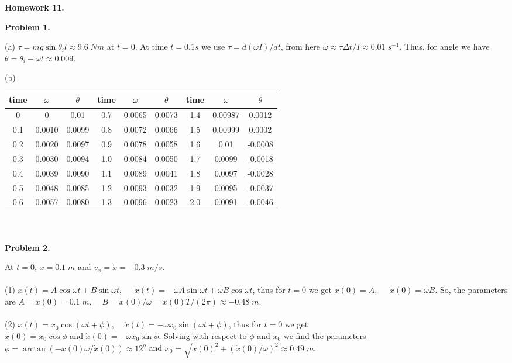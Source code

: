 \documentclass[12pt]{article}
\begin{document}
\begin{center}
{\bf\large Homework 11.}
\end{center}

{\bf Problem 1.}

(a) $\tau=mg\sin\theta_i l\approx 9.6\;Nm$ at $t=0$.
At time $t=0.1s$ we use $\tau=d(\omega I)/dt$, from here $\omega\approx \tau\Delta t /I\approx
0.01\;s^{-1}$. Thus, for angle we have $\theta=\theta_i-\omega t\approx 0.009$.

(b)

\begin{tabular}{|c|c|c||c|c|c||c|c|c|}
\hline
time & $\omega$ &$\theta$& time& $\omega$ & $\theta$&time&$\omega$&$\theta$\\
\hline
0&0&0.01&0.7&0.0065&0.0073&1.4&0.00987&0.0012\\
0.1& 0.0010&0.0099&0.8& 0.0072&0.0066&1.5&0.00999&0.0002\\
0.2& 0.0020&0.0097&0.9& 0.0078&0.0058&1.6&0.01&-0.0008\\
0.3& 0.0030&0.0094&1.0& 0.0084&0.0050&1.7&0.0099&-0.0018\\
0.4& 0.0039&0.0090&1.1& 0.0089&0.0041&1.8&0.0097&-0.0028\\
0.5& 0.0048&0.0085&1.2& 0.0093&0.0032&1.9&0.0095&-0.0037\\
0.6& 0.0057&0.0080&1.3& 0.0096&0.0023&2.0&0.0091&-0.0046\\
\hline
\end{tabular}\\
\\

{\bf Problem 2.}

At $t=0$, $x=0.1\;m$ and $v_x=\dot{x}=-0.3\;m/s$.\\
\\
(1) $x(t)=A\cos\omega t + B\sin\omega t,\;\;\;\;\;\dot{x}(t)=-\omega A\sin\omega t + \omega B\cos\omega t$, thus for $t=0$ we get $x(0)=A,\;\;\;\;\;\dot{x}(0)= \omega B$. So, the parameters are
$A=x(0)=0.1\;m,\;\;\;\;B=\dot{x}(0)/\omega=\dot{x}(0) T/(2\pi)\approx -0.48\;m$.\\
\\
(2) $x(t)=x_0 \cos(\omega t +\phi),\;\;\;\;\dot{x}(t)=-\omega x_0 \sin(\omega t +\phi)$, thus for $t=0$
we get\\  $x(0)=x_0\cos\phi$ and $\dot{x}(0)=-\omega x_0 \sin\phi$. Solving with respect to $\phi$ and $x_0$ we find the parameters $\phi=\arctan\left(-x(0)\omega/\dot{x}(0)\right)\approx 12^o$ and
$x_0=\sqrt{x(0)^2+\left(\dot{x}(0)/\omega\right)^2}\approx 0.49\;m$.\\
\end{document}
